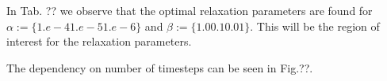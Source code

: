 \documentclass[11pt,a4paper]{article}
\begin{document}
In Tab. ?? we observe that the optimal relaxation parameters are found for $\alpha := \lbrace 1.e-4 1.e-5 1.e-6 \rbrace$ and $\beta := \lbrace 1.0 0.1 0.01 \rbrace$. This will be the region of interest for the relaxation parameters.

The dependency on number of timesteps can be seen in Fig.??.








\end{document}
